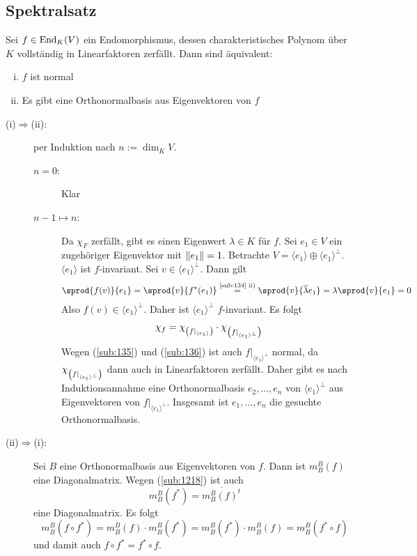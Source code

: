 \subsection{Spektralsatz} %
\label{sub:137}
Sei $f \in \End_K(V)$ ein Endomorphismus, dessen charakteristisches Polynom über $K$ vollständig in Linearfaktoren zerfällt. Dann sind äquivalent:
\begin{enumerate}[(i)]
	\item $f$ ist normal
	\item Es gibt eine Orthonormalbasis aus Eigenvektoren von $f$
\end{enumerate}
\begin{description}
	\item[(i)$\Rightarrow$(ii):] per Induktion nach $n := \dim_K V$.
	\begin{description}
		\item[$n=0$:] Klar
		\item[$n-1 \mapsto n$:] Da $\chi_F$ zerfällt, gibt es einen Eigenwert $\lambda  \in K$ für $f$. Sei $e_1\in V$ ein zugehöriger Eigenvektor mit $\norm{e_1} =1$.
		Betrachte $V = \langle e_1\rangle \oplus \langle e_1 \rangle^\bot$. $\langle e_1 \rangle$ ist $f$-invariant. Sei $v \in \langle e_1\rangle^\bot$. Dann gilt
		\begin{align*}
			\sprod{f(v)}{e_1} = \sprod{v}{f^*(e_1)} \stackrel{\text{\ref{sub:134} ii)}}{=} \sprod{v}{\overline{\lambda } e_1 }  = \lambda \sprod{v}{e_1} =0
		\end{align*}
		Also $f(v) \in \langle e_1\rangle^\bot$. Daher ist $\langle e_1 \rangle^\bot$ $f$-invariant. Es folgt 
		\[
			\chi_f = \chi_{\enbrace*{f|_{\langle e_1\rangle}}} \cdot \chi_{\enbrace*{f|_{\langle e_1\rangle^\bot}} }
		\]
		Wegen (\ref{sub:135}) und (\ref{sub:136}) ist auch $f\big|_{\langle e_1\rangle^\bot}$ normal, da $\chi_{\enbrace*{f|_{\langle e_1\rangle^\bot}} }$ dann auch in 
		Linearfaktoren zerfällt. Daher gibt es nach Induktionsannahme eine Orthonormalbasis 
		$e_2, \ldots, e_n$ von $\langle e_1\rangle^\bot$ aus Eigenvektoren von $f\big|_{\langle e_1\rangle^\bot}$. Insgesamt ist $e_1, \ldots , e_n$ die gesuchte
		Orthonormalbasis.
	\end{description} 
	\item[(ii)$\Rightarrow$(i):] Sei $B$ eine Orthonormalbasis aus Eigenvektoren von $f$. Dann ist $m_B^B(f)$ eine Diagonalmatrix. Wegen (\ref{sub:1218}) ist auch
	\[
		m_B^B (f^*) = \overline{m_B^B (f)^t} 
	\]
	eine Diagonalmatrix. Es folgt
	\[
		m_B^B (f \circ f^*) = m_B^B(f) \cdot m_B^B(f^*) = m_B^B(f^*) \cdot m_B^B(f) = m_B^B( f^* \circ f)
	\]
	und damit auch $f \circ f^* = f^* \circ f$. \bewende
\end{description}
\newpage
